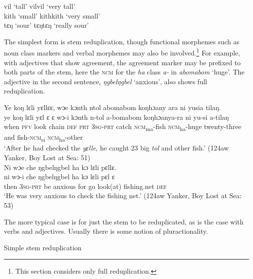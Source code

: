 \TabPositions{1.5cm,5.5cm,7cm,8cm}
\ea%
    \label{ex:191}
    vil \tab ‘tall' \tab vilvil \tab ‘very tall'\\
    kith \tab ‘small' \tab kithkith \tab ‘very small'\\
    tɛŋ \tab ‘sour' \tab tɛŋtɛŋ \tab ‘really sour'\\
\z

The simplest form is stem reduplication, though functional morphemes such as noun class markers and verbal morphemes may also be involved.\footnote{This section considers only full reduplication.} For example, with adjectives that show agreement, the agreement marker may be prefixed to both parts of the stem, here the \textsc{ncm} for the \textit{ha} class \textit{a-} in \textit{abomabom} ‘huge'. The adjective in the second sentence, \textit{ŋgbelŋgbel} ‘anxious', also shows full reduplication.

\ea%
    \label{ex:192}
    \ea \label{ex:192a} Ye koŋ lɛli yɛllɛɛ, wɔe kɔnth ntol abomabom koŋhɔany ara ni yusia tilaŋ.\\
    \gll ye      koŋ  lɛli  yɛl      ɛ    ɛ wɔ{}-i    kɔnth    n-tol      a-bomabom    koŋhɔanya-ra    ni    yu-si        a-tilaŋ\\
    when    \textsc{pfv}  look  chain    \textsc{def}  \textsc{prt} \textsc{3sg-prt}  catch    \textsc{ncm}\textsubscript{ma}{}-fish \textsc{ncm}\textsubscript{ha}{}-huge    twenty-three    and  fish-\textsc{ncm}\textsubscript{si}    \textsc{ncm}\textsubscript{ha}{}-other\\
    \glt ‘After he had checked the \textit{yɛlle}, he caught 23 big \textit{tol} and other fish.' (124aw Yanker, Boy Lost at Sea: 51)\\
   
    \ex \label{ex.192b} Ni wɔe che ŋgbelŋgbel ha kɔ lɛli pɛllɛ.\\
    \gll ni    wɔ{}-i    che  ŋgbelŋgbel  ha    kɔ    lɛli      pɛl        ɛ\\
    then  \textsc{3sg}{}-\textsc{prt}  be    anxious    for    go    look(at)    fishing.net  \textsc{def}\\
    \glt ‘He was very anxious to check the fishing net.' (124aw Yanker, Boy Lost at Sea: 53)
\z
\z

The more typical case is for just the stem to be reduplicated, as is the case with verbs and adjectives. Usually there is some notion of pluractionality.

\TabPositions{1.5cm,4.5cm,7cm,8cm}
\ea%
    \label{ex:193} Simple stem reduplication\\

